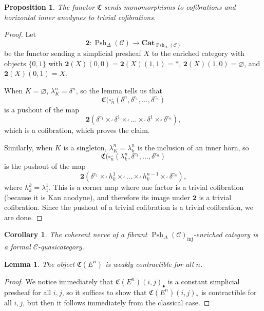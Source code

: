 \documentclass[leqno]{article}
\numberwithin{equation}{subsection}
\theoremstyle{plain}   %
\newtheorem{prop}[equation]{Proposition}
\newtheorem{cor}[equation]{Corollary}
\newtheorem{lemma}[equation]{Lemma}
\theoremstyle{remark}
\theoremstyle{plain}
\newcommand{\Cat}{\ensuremath{\mathbf{Cat}}}
\providecommand{\C}{}
\renewcommand{\C}{\ensuremath{\mathcal{C}}}
\newcommand{\spsh}{\ensuremath{\operatorname{Psh}_\Delta(\mathcal{C})}}
\begin{document}
\begin{prop}\label{quillen1}
	The functor \(\mathfrak{C}\) sends monomorphisms to cofibrations and horizontal inner anodynes to trivial cofibrations.
\end{prop}
\begin{proof}
	Let \[\mathbf{2}:\spsh \to \Cat_{\spsh}\] be the functor sending a simplicial presheaf \(X\) to the enriched category with objects \(\{0,1\}\) with \(\mathbf{2}(X)(0,0)=\mathbf{2}(X)(1,1)=\ast\), \(\mathbf{2}(X)(1,0)=\varnothing\), and \(\mathbf{2}(X)(0,1)=X\).

	When \(K=\varnothing\), \(\lambda^n_K=\delta^n\), so the lemma tells us that \[\mathfrak{C}(\square^\lrcorner_n(\delta^n,\delta^{c_1},\dots,\delta^{c_n})\] is a pushout of the map \[\mathbf{2}(\delta^{c_1}\times^\lrcorner \delta^1 \times^\lrcorner \dots \times^\lrcorner \delta^1 \times^\lrcorner \delta^{c_n}),\] which is a cofibration, which proves the claim.

	Similarly, when \(K\) is a singleton, \(\lambda^n_K=\lambda^n_k\) is the inclusion of an inner horn, so \[\mathfrak{C}(\square^\lrcorner_n(\lambda^n_k,\delta^{c_1},\dots,\delta^{c_n})\] is the pushout of the map \[\mathbf{2}(\delta^{c_1}\times^\lrcorner h^1_k \times^\lrcorner \dots \times^\lrcorner h^{n-1}_k \times^\lrcorner \delta^{c_n}),\] where \(h^k_k=\lambda^1_1\).  This is a corner map where one factor is a trivial cofibration (because it is Kan anodyne), and therefore its image under \(\mathbf{2}\) is a trivial cofibration.  Since the pushout of a trivial cofibration is a trivial cofibration, we are done.
\end{proof}

\begin{cor}
	The coherent nerve of a fibrant \(\spsh_{\mathrm{inj}}\)-enriched category is a formal \(\C\)-quasicategory.
\end{cor}

\begin{lemma}
	The object \(\mathfrak{C}(E^n)\) is weakly contractible for all \(n\).
\end{lemma}
\begin{proof}
	We notice immediately that \(\mathfrak{C}(E^n)(i,j)_\bullet\) is a constant simplicial presheaf for all \(i,j\), so it suffices to show that \(\mathfrak{C}(E^n)(i,j)_\ast\) is contractible for all \(i,j\), but then it follows immediately from the classical case.
\end{proof}
\end{document}
